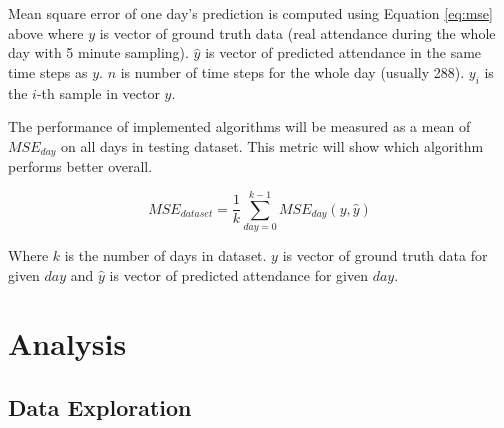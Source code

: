 \documentclass{article}
\begin{document}
Mean square error of one day's prediction is computed using Equation \ref{eq:mse} above where $y$ is vector of ground truth data (real attendance during the whole day with 5 minute sampling). $\hat{y}$ is vector of predicted attendance in the same time steps as $y$. $n$ is number of time steps for the whole day (usually 288). $y_i$ is the $i$-th sample in vector $y$. 

The performance of implemented algorithms will be measured as a mean of $MSE_{day}$ on all days in testing dataset. This metric will show which algorithm performs better overall.

\begin{equation}
\label{eq:mse_all}
MSE_{dataset} = \dfrac{1}{k} \sum^{k-1}_{day=0}MSE_{day}(y,\hat{y})
\end{equation}

Where $k$ is the number of days in dataset. $y$ is vector of ground truth data for given $day$ and $\hat{y}$ is vector of predicted attendance for given $day$.

\section{Analysis}
\subsection{Data Exploration} \label{sec:data_exploration}
\end{document}
